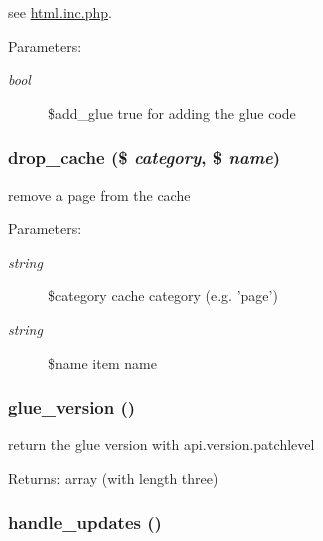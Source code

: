 see \hyperlink{html_8inc_8php}{html.inc.php}. \begin{Desc}
\item[Parameters:]
\begin{description}
\item[{\em bool}]\$add\_\-glue true for adding the glue code \end{description}
\end{Desc}
\hypertarget{common_8inc_8php_7ca47f8aab349971cde2d4b02441cf41}{
\subsubsection[{drop\_\-cache}]{\setlength{\rightskip}{0pt plus 5cm}drop\_\-cache (\$ {\em category}, \/  \$ {\em name})}}
\label{common_8inc_8php_7ca47f8aab349971cde2d4b02441cf41}


remove a page from the cache

\begin{Desc}
\item[Parameters:]
\begin{description}
\item[{\em string}]\$category cache category (e.g. 'page') \item[{\em string}]\$name item name \end{description}
\end{Desc}
\hypertarget{common_8inc_8php_0d6d0da45f4adf6283bcccec9fd107e3}{
\subsubsection[{glue\_\-version}]{\setlength{\rightskip}{0pt plus 5cm}glue\_\-version ()}}
\label{common_8inc_8php_0d6d0da45f4adf6283bcccec9fd107e3}


return the glue version with api.version.patchlevel

\begin{Desc}
\item[Returns:]array (with length three) \end{Desc}
\hypertarget{common_8inc_8php_a8712e8d1a52e2b8f00ecaf839205d24}{
\subsubsection[{handle\_\-updates}]{\setlength{\rightskip}{0pt plus 5cm}handle\_\-updates ()}}
\label{common_8inc_8php_a8712e8d1a52e2b8f00ecaf839205d24}


